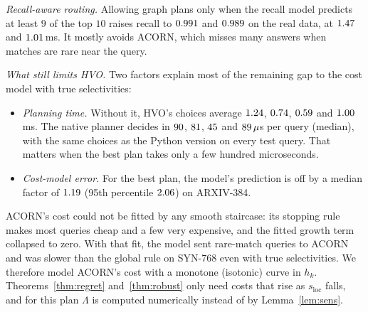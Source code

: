 \documentclass[sigconf,nonacm]{acmart}
\newcommand{\sloc}{s_{\text{loc}}}
\begin{document}
\emph{Recall-aware routing.} Allowing graph plans only when the recall model predicts at least $9$ of the top $10$ raises recall to $0.991$ and $0.989$ on the real data, at $1.47$ and $1.01$\,ms. It mostly avoids ACORN, which misses many answers when matches are rare near the query.

\emph{What still limits HVO.} Two factors explain most of the remaining gap to the cost model with true selectivities:
\begin{itemize}
    \item \emph{Planning time.} Without it, HVO's choices average $1.24$, $0.74$, $0.59$ and $1.00$\,ms. The native planner decides in $90$, $81$, $45$ and $89\,\mu$s per query (median), with the same choices as the Python version on every test query. That matters when the best plan takes only a few hundred microseconds.
    \item \emph{Cost-model error.} For the best plan, the model's prediction is off by a median factor of $1.19$ (95th percentile $2.06$) on ARXIV-384.
\end{itemize}
ACORN's cost could not be fitted by any smooth staircase: its stopping rule makes most queries cheap and a few very expensive, and the fitted growth term collapsed to zero. With that fit, the model sent rare-match queries to ACORN and was slower than the global rule on SYN-768 even with true selectivities. We therefore model ACORN's cost with a monotone (isotonic) curve in $h_k$. Theorems~\ref{thm:regret} and~\ref{thm:robust} only need costs that rise as $\sloc$ falls, and for this plan $\Lambda$ is computed numerically instead of by Lemma~\ref{lem:sens}.
\end{document}
